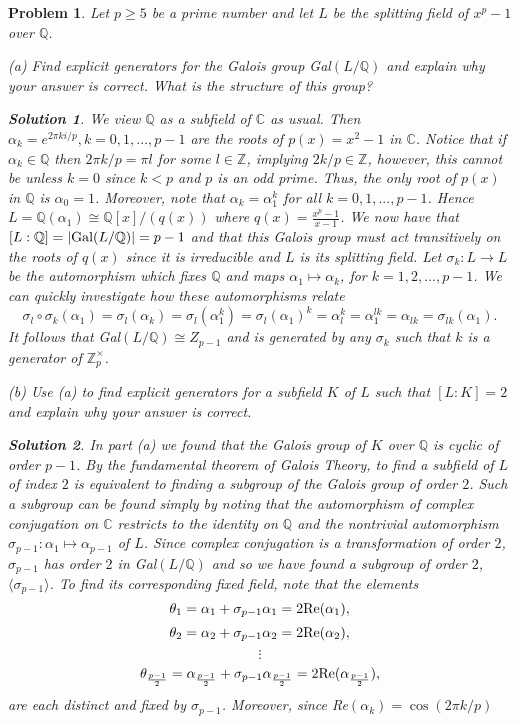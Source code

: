 \documentclass[11pt]{article}
\newcommand{\Z}{\mathbb{Z}}
\newcommand{\C}{\mathbb{C}}
\newcommand{\1}{\textbf{1}}
\newtheorem{prob}{Problem}
\newtheorem*{sol*}{\textit{Solution}}
\begin{document}
\begin{prob}
Let $p\geq 5$ be a prime number and let $L$ be the splitting field of $x^p -1$ over $\mathbb{Q}$. 

\noindent (a) Find explicit generators for the Galois group Gal$(L/\mathbb{Q})$ and explain why your answer is correct. What is the structure of this group?

\begin{sol*}
\textnormal{We view $\mathbb{Q}$ as a subfield of $\C$ as usual. Then $\alpha_k = e^{2\pi k i/p}, k = 0,1,...,p-1$ are the roots of $p(x) = x^2 -1$ in $\C$. Notice that if $\alpha_k\in\mathbb{Q}$ then $2\pi k /p  = \pi l$ for some $l\in\Z$, implying $2 k / p \in\Z $, however, this cannot be unless $k = 0$ since $k < p$ and $p$ is an odd prime. Thus, the only root of $p(x)$ in $\mathbb{Q}$ is $\alpha_0 = 1$. Moreover, note that $\alpha_k = \alpha_1^k$ for all $k = 0,1,...,p-1$. Hence $L = \mathbb{Q}(\alpha_1)\cong \mathbb{Q}[x]/(q(x))$ where $q(x) = \frac{x^p-1}{x-1}$. We now have that $[L:\mathbb{Q}] = |\textnormal{Gal}(L/\mathbb{Q})| = p-1$ and that this Galois group must act transitively on the roots of $q(x)$ since it is irreducible and $L$ is its splitting field. Let $\sigma_k:L\rightarrow L$ be the automorphism which fixes $\mathbb{Q}$ and maps $\alpha_1\mapsto \alpha_k$, for $k = 1,2,...,p-1$. We can quickly investigate how these automorphisms relate \[\sigma_l\circ\sigma_k(\alpha_1) = \sigma_l(\alpha_k) = \sigma_l(\alpha_1^k) = \sigma_l(\alpha_1)^k = \alpha_l^k = \alpha_1^{lk} = \alpha_{lk} = \sigma_{lk}(\alpha_1).\] It follows that Gal$(L/\mathbb{Q})\cong Z_{p-1}$ and is generated by any $\sigma_k$ such that $k$ is a generator of $\Z_p^\times$. 
}
\end{sol*}

\noindent (b) Use (a) to find explicit generators for a subfield $K$ of $L$ such that $[L:K] =2$ and explain why your answer is correct. 

\begin{sol*}
\textnormal{In part (a) we found that the Galois group of $K$ over $\mathbb{Q}$ is cyclic of order $p-1$. By the fundamental theorem of Galois Theory, to find a subfield of $L$ of index $2$ is equivalent to finding a subgroup of the Galois group of order $2$. Such a subgroup can be found simply by noting that the automorphism of complex conjugation on $\C$ restricts to the identity on $\mathbb{Q}$ and the nontrivial automorphism $\sigma_{p-1}:\alpha_1\mapsto \alpha_{p-1}$ of $L$. Since complex conjugation is a transformation of order $2$, $\sigma_{p-1}$ has order $2$ in Gal$(L/\mathbb{Q})$ and so we have found a subgroup of order $2$, $\langle\sigma_{p-1}\rangle$. To find its corresponding fixed field, note that the elements \[\theta_1 = \alpha_1 + \sigma_{p-1}\alpha_1 = 2\textnormal{Re}(\alpha_1),\]\[\theta_2 = \alpha_2 + \sigma_{p-1}\alpha_2 = 2\textnormal{Re}(\alpha_2),\] \[\vdots\] \[\theta_{\frac{p-1}{2}} =  \alpha_{\frac{p-1}{2}} + \sigma_{p-1}\alpha_{\frac{p-1}{2}} = 2\textnormal{Re}(\alpha_{\frac{p-1}{2}}),\] are each distinct and fixed by $\sigma_{p-1}$. Moreover, since Re$(\alpha_k) = \cos(2\pi k/ p)$
}
\end{sol*}
\end{prob}
\end{document}
